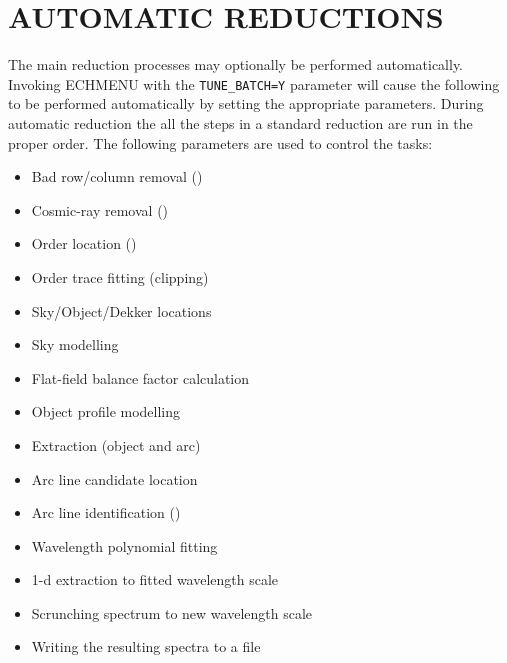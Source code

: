 \sunspec{\end{description}}{}


\section{AUTOMATIC REDUCTIONS}

The main reduction processes may optionally be performed
automatically. Invoking ECHMENU with the {\tt TUNE\_BATCH=Y} parameter will
cause the following  to be performed automatically
by setting the appropriate parameters. During automatic reduction the
all the steps in a standard reduction are run in the proper order.
The following parameters are used to control the tasks:


\begin{itemize}

\item Bad row/column removal ()

\item Cosmic-ray removal ()

\item Order location ()

\item Order trace fitting (clipping)

\item Sky/Object/Dekker locations

\item Sky modelling

\item Flat-field balance factor calculation

\item Object profile modelling

\item Extraction (object and arc)

\item Arc line candidate location

\item Arc line identification ()

\item Wavelength polynomial fitting

\item 1-d extraction to fitted wavelength scale

\item Scrunching spectrum to new wavelength scale

\item Writing the resulting spectra to a file

\end{itemize}

